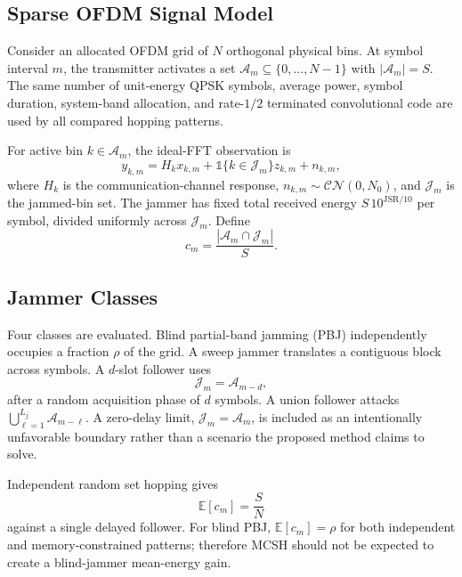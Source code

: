 \documentclass[journal,10pt]{IEEEtran}
\begin{document}
\subsection{Sparse OFDM Signal Model}
Consider an allocated OFDM grid of $N$ orthogonal physical bins. At symbol
interval $m$, the transmitter activates a set
$\mathcal{A}_m\subseteq\{0,\ldots,N-1\}$ with $|\mathcal{A}_m|=S$. The same
number of unit-energy QPSK symbols, average power, symbol duration, system-band
allocation, and rate-$1/2$ terminated convolutional code are used by all
compared hopping patterns.

For active bin $k\in\mathcal{A}_m$, the ideal-FFT observation is
\begin{equation}
y_{k,m}=H_k x_{k,m}+\mathds{1}\{k\in\mathcal{J}_m\}z_{k,m}+n_{k,m},
\label{eq:signal}
\end{equation}
where $H_k$ is the communication-channel response,
$n_{k,m}\sim\mathcal{CN}(0,N_0)$, and $\mathcal{J}_m$ is the jammed-bin set.
The jammer has fixed total received energy $S\,10^{\mathrm{JSR}/10}$ per
symbol, divided uniformly across $\mathcal{J}_m$. Define
\begin{equation}
c_m=\frac{|\mathcal{A}_m\cap\mathcal{J}_m|}{S}.
\label{eq:collision}
\end{equation}

\subsection{Jammer Classes}
Four classes are evaluated. Blind partial-band jamming (PBJ) independently
occupies a fraction $\rho$ of the grid. A sweep jammer translates a contiguous
block across symbols. A $d$-slot follower uses
\begin{equation}
\mathcal{J}_m=\mathcal{A}_{m-d},
\label{eq:follower}
\end{equation}
after a random acquisition phase of $d$ symbols. A union follower attacks
$\bigcup_{\ell=1}^{L_j}\mathcal{A}_{m-\ell}$. A zero-delay limit,
$\mathcal{J}_m=\mathcal{A}_m$, is included as an intentionally unfavorable
boundary rather than a scenario the proposed method claims to solve.

Independent random set hopping gives
\begin{equation}
\mathbb{E}[c_m]=\frac{S}{N}
\label{eq:random_collision}
\end{equation}
against a single delayed follower. For blind PBJ,
$\mathbb{E}[c_m]=\rho$ for both independent and memory-constrained patterns;
therefore MCSH should not be expected to create a blind-jammer mean-energy
gain.
\end{document}
